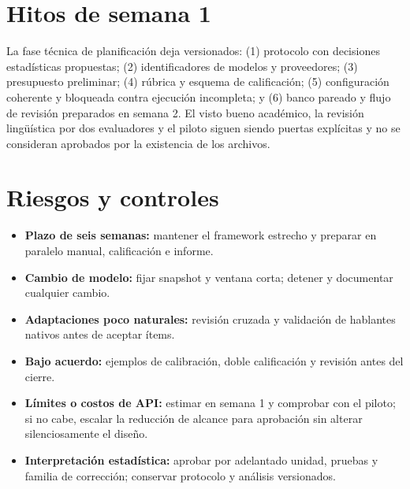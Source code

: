 \documentclass[conference]{IEEEtran}
\begin{document}
\section{Hitos de semana 1}
La fase técnica de planificación deja versionados: (1) protocolo con decisiones estadísticas propuestas; (2) identificadores de modelos y proveedores; (3) presupuesto preliminar; (4) rúbrica y esquema de calificación; (5) configuración coherente y bloqueada contra ejecución incompleta; y (6) banco pareado y flujo de revisión preparados en semana 2. El visto bueno académico, la revisión lingüística por dos evaluadores y el piloto siguen siendo puertas explícitas y no se consideran aprobados por la existencia de los archivos.

\section{Riesgos y controles}
\begin{itemize}[leftmargin=*]
\item \textbf{Plazo de seis semanas:} mantener el framework estrecho y preparar en paralelo manual, calificación e informe.
\item \textbf{Cambio de modelo:} fijar snapshot y ventana corta; detener y documentar cualquier cambio.
\item \textbf{Adaptaciones poco naturales:} revisión cruzada y validación de hablantes nativos antes de aceptar ítems.
\item \textbf{Bajo acuerdo:} ejemplos de calibración, doble calificación y revisión antes del cierre.
\item \textbf{Límites o costos de API:} estimar en semana 1 y comprobar con el piloto; si no cabe, escalar la reducción de alcance para aprobación sin alterar silenciosamente el diseño.
\item \textbf{Interpretación estadística:} aprobar por adelantado unidad, pruebas y familia de corrección; conservar protocolo y análisis versionados.
\end{itemize}
\end{document}
